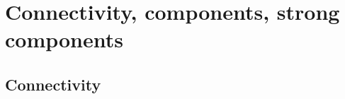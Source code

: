 %
%
%
%
%
%
%
%
%
%

\chapter{Connectivity, components, strong components}

\section{Connectivity}
\label{sec:connectivity}

